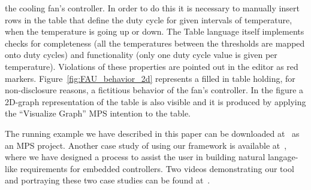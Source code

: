 the cooling fan's controller. In order to do this it is necessary to manually
insert rows in the table that define the duty cycle for given intervals of
temperature, when the temperature is going up or down.
The \textsf{Table} language itself implements checks for completeness (all the
temperatures between the thresholds are mapped onto duty cycles) and
functionality (only one duty cycle value is given per temperature). Violations
of these properties are pointed out in the editor as red markers.
Figure~\ref{fig:FAU_behavior_2d} represents a filled in table holding, for
non-disclosure reasons, a fictitious behavior of the fan's controller.
In the figure a 2D-graph representation of the table is also visible and it is
produced by applying the “Visualize Graph” MPS intention to the table.

The running example we have described in this paper can be downloaded
at~\cite{coolingControllerProcess} as an MPS project. Another case study of
using our framework is available at~\cite{earsctrlProcess}, where we have
designed a process to assist the user in building natural langage-like
requirements for embedded controllers. Two videos demonstrating our
tool and portraying these two case studies can be found
at~\cite{coolingControllerProcessVideo,earsctrlProcessVideo}.
 \vspace{-.4cm}
  




